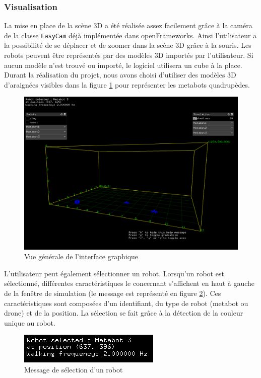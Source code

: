\subsubsection{Visualisation}

La mise en place de la scène 3D a été réalisée assez facilement grâce à la caméra de la classe \verb|EasyCam| déjà implémentée dans openFrameworks. Ainsi l'utilisateur a la possibilité de se déplacer et de zoomer dans la scène 3D grâce à la souris. Les robots peuvent être représentés par des modèles 3D importés par l'utilisateur. Si aucun modèle n'est trouvé ou importé, le logiciel utilisera un cube à la place. Durant la réalisation du projet, nous avons choisi d'utiliser des modèles 3D d'araignées visibles dans la figure \ref{interface} pour représenter les metabots quadrupèdes.

\begin{figure}[H]
\centering
\includegraphics[scale=0.37]{imgs/view2}
\caption{Vue générale de l'interface graphique}
\label{interface}
\end{figure}

L'utilisateur peut également sélectionner un robot. Lorsqu'un robot est sélectionné, différentes caractéristiques le concernant s'affichent en haut à gauche de la fenêtre de simulation (le message est représenté en figure \ref{mselec}). Ces caractéristiques sont composées d'un identifiant, du type de robot (metabot ou drone) et de la position. La sélection se fait grâce à la détection de la couleur unique au robot.

\begin{figure}[H]
\centering
\includegraphics[scale=0.7]{imgs/selection}
\caption{Message de sélection d'un robot}
\label{mselec}
\end{figure}

